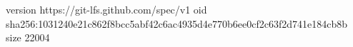 version https://git-lfs.github.com/spec/v1
oid sha256:1031240e21c862f8bcc5abf42c6ac4935d4e770b6ee0cf2c63f2d741e184cb8b
size 22004
